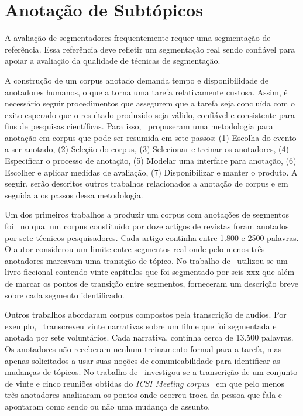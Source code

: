 \section{Anotação de Subtópicos}

A avaliação de segmentadores frequentemente requer uma segmentação de referência. Essa referência deve refletir um segmentação real sendo confiável para apoiar a avaliação da qualidade de técnicas de segmentação. 

A construção de um corpus anotado demanda tempo e disponibilidade de anotadores humanos, o que a torna uma tarefa relativamente custosa. 
Assim, é necessário seguir procedimentos que assegurem que a tarefa seja concluída com o exito esperado que o resultado produzido seja válido, confiável e consistente para fins de pesquisas científicas. Para isso,~\cite{Hovy2010} propuseram uma metodologia para anotação em corpus que pode ser resumida em sete passos: 
(1) Escolha do evento a ser anotado, %
(2) Seleção do corpus,%
(3) Selecionar e treinar os anotadores,
(4) Especificar o processo de anotação,
(5) Modelar uma interface para anotação,
(6) Escolher e aplicar medidas de avaliação,
(7) Disponibilizar e manter o produto.
% 
A seguir, serão descritos outros trabalhos relacionados a anotação de corpus e em seguida a os passos dessa metodologia. %

Um dos primeiros trabalhos a produzir um corpus com anotações de segmentos foi~\cite{Hearst1997} no qual um corpus constituído por doze artigos de revistas foram anotados por sete técnicos pesquisadores. Cada artigo continha entre 1.800 e 2500 palavras. O autor considerou um limite entre segmentos real onde pelo menos três anotadores marcavam uma transição de tópico. No trabalho de~\cite{Kazantseva2012} utilizou-se um livro ficcional contendo vinte capítulos que foi segmentado por seis xxx que além de marcar os pontos de transição entre segmentos, forneceram um descrição breve sobre cada segmento identificado. 

Outros trabalhos abordaram corpus compostos pela transcrição de audios. Por exemplo,~\cite{Passonneau1997} transcreveu vinte narrativas sobre um filme que foi segmentada e anotada por sete voluntários. Cada narrativa, continha cerca de 13.500 palavras. Os anotadores não receberam nenhum treinamento formal para a tarefa, mas apenas solicitados a usar suas noções de comunicabilidade para identificar as mudanças de tópicos. No trabalho de~\cite{Galley2003} investigou-se a transcrição de um conjunto de vinte e cinco reuniões obtidas do \textit{ICSI Meeting corpus}~\cite{Janin2003} em que pelo menos três anotadores analisaram os pontos onde ocorreu troca da pessoa que fala e apontaram como sendo ou não uma mudança de assunto.  

